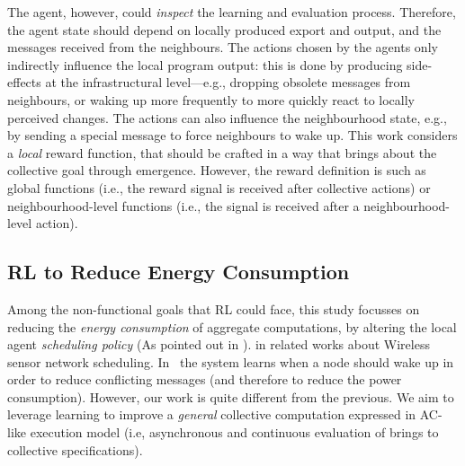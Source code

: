 %
The agent, however, could \emph{inspect} the learning and evaluation process. 
 Therefore, the agent state should depend on locally produced export and output, 
 and the messages received from the neighbours.
%
The actions chosen by the agents only indirectly influence the local program output: 
 this is done by producing side-effects at the infrastructural level---e.g., 
 dropping obsolete messages from neighbours, 
 or waking up more frequently to more quickly 
 react to locally perceived changes.
%
The actions can also influence the neighbourhood state, e.g., by sending a special message to force neighbours to wake up.
%
This work considers a \emph{local} reward function, that should be crafted in a way that brings about the collective goal through emergence. 
%
However, the reward definition is   
such as global functions (i.e., the reward signal is received after collective actions) or neighbourhood-level functions (i.e., the signal is received after a neighbourhood-level action).

\subsection{\Acl{RL} to Reduce Energy Consumption}\label{acsos2022:acrl-energy-goal}
Among the non-functional goals that \ac{RL} could face, 
 this study %
 focusses on reducing the \emph{energy consumption} of aggregate computations,
 by altering the local agent \emph{scheduling policy} (As pointed out in ).
%
%
 in related works about Wireless sensor network scheduling.
In~\cite{DBLP:journals/automatica/IwakiWWSJ21,DBLP:journals/ijcnds/MihaylovBTN12} the system learns 
when a node should wake up in order to reduce conflicting messages 
(and therefore to reduce the power consumption). 
However, our work is quite different from the previous. 
We aim to leverage learning to improve a \emph{general} collective computation 
expressed in \ac{AC}-like execution model (i.e, asynchronous and continuous evaluation of  brings to collective specifications).

